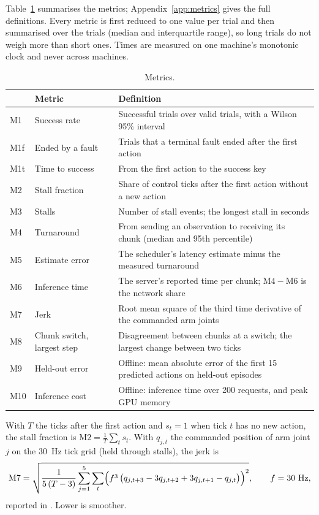 Table~\ref{tab:metrics} summarises the metrics; Appendix~\ref{app:metrics} gives the full definitions. Every metric is
first reduced to one value per trial and then summarised over the trials (median and interquartile range), so long
trials do not weigh more than short ones. Times are measured on one machine's monotonic clock and never across
machines.

\begin{table}[htbp]
  \centering
  \caption{Metrics.}
  \label{tab:metrics}
  \small
  \begin{tabularx}{\textwidth}{l l X}
    \toprule
    & Metric & Definition \\
    \midrule
    M1 & Success rate & Successful trials over valid trials, with a Wilson 95\% interval \\
    M1f & Ended by a fault & Trials that a terminal fault ended after the first action \\
    M1t & Time to success & From the first action to the success key \\
    M2 & Stall fraction & Share of control ticks after the first action without a new action \\
    M3 & Stalls & Number of stall events; the longest stall in seconds \\
    M4 & Turnaround & From sending an observation to receiving its chunk (median and 95th percentile) \\
    M5 & Estimate error & The scheduler's latency estimate minus the measured turnaround \\
    M6 & Inference time & The server's reported time per chunk; $\mathrm{M4}-\mathrm{M6}$ is the network share \\
    M7 & Jerk & Root mean square of the third time derivative of the commanded arm joints \\
    M8 & Chunk switch, largest step & Disagreement between chunks at a switch; the largest change between two ticks \\
    M9 & Held-out error & Offline: mean absolute error of the first 15 predicted actions on held-out episodes \\
    M10 & Inference cost & Offline: inference time over 200 requests, and peak GPU memory \\
    \bottomrule
  \end{tabularx}
\end{table}

With $T$ the ticks after the first action and $s_t=1$ when tick $t$ has no new action, the stall fraction is
$\mathrm{M2} = \frac{1}{T}\sum_t s_t$. With $q_{j,t}$ the commanded position of arm joint $j$ on the 30~Hz tick grid
(held through stalls), the jerk is
\begin{equation}
  \mathrm{M7} = \sqrt{\frac{1}{5\,(T-3)} \sum_{j=1}^{5} \sum_{t} \Bigl( f^3\,\bigl(q_{j,t+3} - 3q_{j,t+2} + 3q_{j,t+1}
  - q_{j,t}\bigr) \Bigr)^{2}}, \qquad f = 30~\mathrm{Hz},
\end{equation}
reported in \jerkunit. Lower is smoother.

